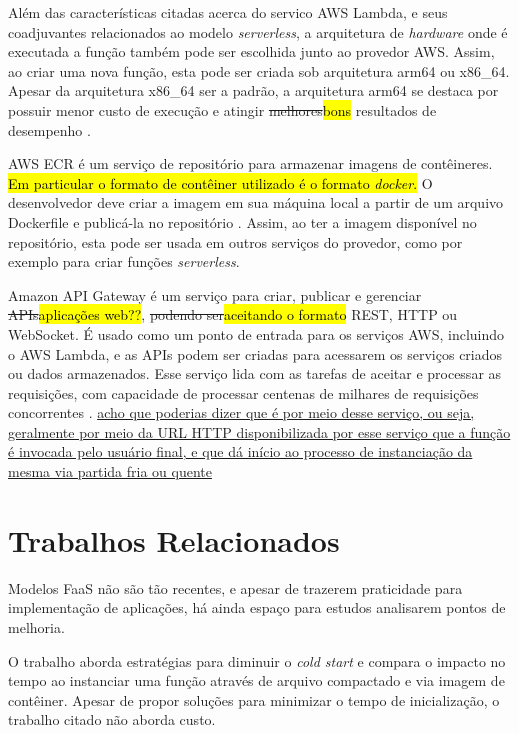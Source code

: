 \documentclass[10pt,conference]{IEEEtran}
\begin{document}
Além das características citadas acerca do servico AWS Lambda, e seus coadjuvantes relacionados ao modelo \textit{serverless}, a arquitetura de \textit{hardware} onde é executada a função também pode ser escolhida junto ao provedor AWS. Assim, ao criar uma nova função, esta pode ser criada sob arquitetura arm64 ou x86\_64. Apesar da arquitetura x86\_64 ser a padrão, a arquitetura arm64 se destaca por possuir menor custo de execução e atingir \st{melhores}\hl{bons} resultados de desempenho
\cite{aws_2023_aws_lambda_architectures}.

AWS ECR é um serviço de repositório para armazenar imagens de contêineres. \hl{Em particular o formato de contêiner utilizado é o formato \textit{docker}.} O desenvolvedor deve criar a imagem em sua máquina local a partir de um arquivo Dockerfile e publicá-la no repositório \cite{aws_2023_aws_ecr}. Assim, ao ter a imagem disponível no repositório, esta pode ser usada em outros serviços do provedor, como por exemplo para criar funções \textit{serverless}.

Amazon API Gateway é um serviço para criar, publicar e gerenciar \st{APIs}\hl{aplicações web??}, \st{podendo ser}\hl{aceitando o formato} REST, HTTP ou WebSocket. É usado como um ponto de entrada para os serviços AWS, incluindo o AWS Lambda, e as APIs podem ser criadas para acessarem os serviços criados ou dados armazenados. Esse serviço lida com as tarefas de aceitar e processar as requisições, com capacidade de processar centenas de milhares de requisições concorrentes \cite{aws_2023_what_is_api_gateway}. \ul{acho que poderias dizer que é por meio desse serviço, ou seja, geralmente por meio da URL HTTP disponibilizada por esse serviço que a função é invocada pelo usuário final, e que dá início ao processo de instanciação da mesma via partida fria ou quente}


\section{Trabalhos Relacionados}
\label{sec:TrabRel}

Modelos FaaS não são tão recentes, e apesar de trazerem praticidade para implementação de aplicações, há ainda espaço para estudos analisarem pontos de melhoria.

O trabalho \cite{dantas_2022_reducing_cold_start} aborda estratégias para diminuir o \textit{cold start} e compara o impacto no tempo ao instanciar uma função através de arquivo compactado e via imagem de contêiner. Apesar de propor soluções para minimizar o tempo de inicialização, o trabalho citado não aborda custo.
\end{document}
